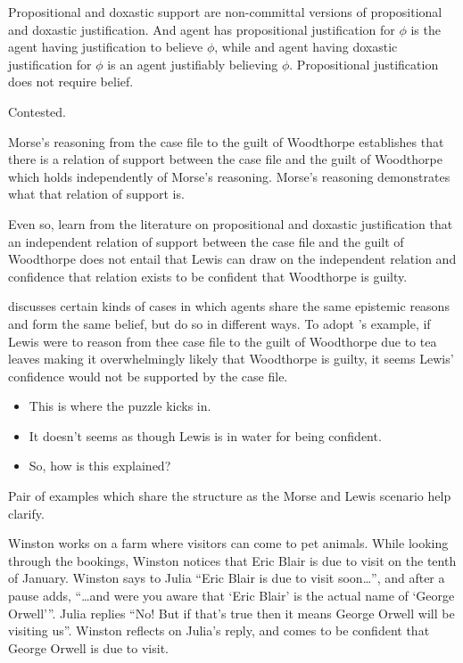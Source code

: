 \documentclass[10pt]{article}
\begin{document}
Propositional and doxastic support are non-committal versions of propositional and doxastic justification.
And agent has propositional justification for \(\phi\) is the agent having justification to believe \(\phi\), while and agent having doxastic justification for \(\phi\) is an agent justifiably believing \(\phi\).
Propositional justification does not require belief.

Contested.

Morse's reasoning from the case file to the guilt of Woodthorpe establishes that there is a relation of support between the case file and the guilt of Woodthorpe which holds independently of Morse's reasoning.
Morse's reasoning demonstrates what that relation of support is.

Even so, learn from the literature on propositional and doxastic justification that an independent relation of support between the case file and the guilt of Woodthorpe does not entail that Lewis can draw on the independent relation and confidence that relation exists to be confident that Woodthorpe is guilty.

\textcite{Turri:2010aa} discusses certain kinds of cases in which agents share the same {\color{red} epistemic reasons} and form the same belief, but do so in different ways.
To adopt \citeauthor{Turri:2010aa}'s example, if Lewis were to reason from thee case file to the guilt of Woodthorpe due to tea leaves making it overwhelmingly likely that Woodthorpe is guilty, it seems Lewis' confidence would not be supported by the case file.

\begin{itemize}
\item This is where the puzzle kicks in.
\item It doesn't seems as though Lewis is in water for being confident.
\item So, how is this explained?
\end{itemize}

Pair of examples which share the structure as the Morse and Lewis scenario help clarify.

\begin{scenario}
  Winston works on a farm where visitors can come to pet animals.
  While looking through the bookings, Winston notices that Eric Blair is due to visit on the tenth of January.
  Winston says to Julia ``Eric Blair is due to visit soon\dots'', and after a pause adds, ``\dots and were you aware that `Eric Blair' is the actual name of `George Orwell'''.
  Julia replies ``No! But if that's true then it means George Orwell will be visiting us''.
  Winston reflects on Julia's reply, and comes to be confident that George Orwell is due to visit.
\end{scenario}
\end{document}
